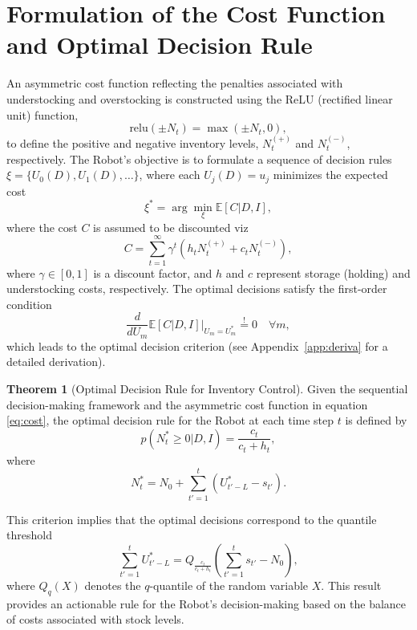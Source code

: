 \documentclass[a4paper,12pt]{article}
\theoremstyle{definition}
\newtheorem{theorem}{Theorem}
\begin{document}
	\section{Formulation of the Cost Function and Optimal Decision Rule}
	An asymmetric cost function reflecting the penalties associated with understocking and overstocking is constructed using the ReLU (rectified linear unit) function,
	\begin{equation}
		\text{relu}(\pm N_t) = \max(\pm N_t, 0),
	\end{equation}
	to define the positive and negative inventory levels, $N_t^{(+)}$ and $N_t^{(-)}$, respectively. The Robot’s objective is to formulate a sequence of decision rules $\xi = \{U_0(D), U_1(D), \dots\}$, where each $U_j(D) = u_j$ minimizes the expected cost
	\begin{equation}
		\xi^* = \arg \min_{\xi} \mathbb{E}[C | D, I],
	\end{equation}
	where the cost $C$ is assumed to be discounted viz
	\begin{equation}
		C = \sum_{t=1}^{\infty} \gamma^{t} \left( h_t N_t^{(+)} + c_t N_{t}^{(-)} \right),
		\label{eq:cost}
	\end{equation}
	where $\gamma \in [0,1]$ is a discount factor, and $h$ and $c$ represent storage (holding) and understocking costs, respectively. The optimal decisions satisfy the first-order condition
	\begin{equation}
		\frac{d}{dU_m} \mathbb{E}[C | D, I] \Big|_{U_m = U_m^*} \overset{!}{=} 0 \quad \forall m,
		\label{eq:min_exp_cost}
	\end{equation}
	which leads to the optimal decision criterion (see Appendix~\ref{app:deriva} for a detailed derivation).
	
	\begin{theorem}[Optimal Decision Rule for Inventory Control]
		Given the sequential decision-making framework and the asymmetric cost function in equation \eqref{eq:cost}, the optimal decision rule for the Robot at each time step $t$ is defined by
		\begin{equation}
			p(N_t^* \geq 0 | D, I) = \frac{c_t}{c_t + h_t},
		\end{equation}
		where
		\begin{equation}
			N_t^* = N_0 + \sum_{t'=1}^{t} (U_{t'-L}^* - s_{t'}).
		\end{equation}
	\end{theorem}
	
	This criterion implies that the optimal decisions correspond to the quantile threshold
	\begin{equation}
		\sum_{t'=1}^{t} U_{t'-L}^* = Q_{\frac{c_t}{c_t+h_t}} \left( \sum_{t'=1}^{t} s_{t'} - N_0 \right),
	\end{equation}
	where $Q_q(X)$ denotes the $q$-quantile of the random variable $X$. This result provides an actionable rule for the Robot’s decision-making based on the balance of costs associated with stock levels.
	
\end{document}
